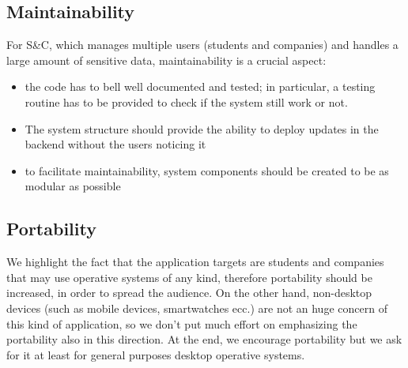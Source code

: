 		\subsection{Maintainability}
			For S\&C, which manages multiple users (students and companies) and handles a large amount of sensitive data, maintainability is a crucial aspect:
			\begin{itemize}
				\item the code has to bell well documented and tested; in particular, a testing routine has to be provided to check if the system still work or not.
				\item The system structure should provide the ability to deploy updates in the backend without the users noticing it
				\item to facilitate maintainability, system components should be created to be as modular as possible
			\end{itemize}
			
			
		\subsection{Portability}
			We highlight the fact that the application targets are students and companies that may use operative systems of any kind, therefore portability should be increased, in order to spread the audience. On the other hand, non-desktop devices (such as mobile devices, smartwatches ecc.) are not an huge concern of this kind of application, so we don't put much effort on emphasizing the portability also in this direction. At the end, we encourage portability but we ask for it at least for general purposes desktop operative systems.